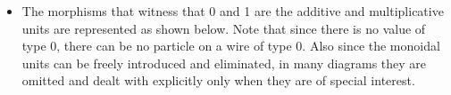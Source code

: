 \documentclass[preprint]{sigplanconf}
\begin{document}
\begin{itemize}
\item The morphisms that witness that {{0}} and {{1}} are the additive and
  multiplicative units are represented as shown below. Note that since there
  is no value of type 0, there can be no particle on a wire of type {{0}}.
  Also since the monoidal units can be freely introduced and eliminated, in
  many diagrams they are omitted and dealt with explicitly only when they are
  of special interest.
\begin{multicols}{2}
\begin{center}
\end{center}
\begin{center}
\end{center}  
\end{multicols}
\begin{multicols}{2}
\begin{center}
\end{center}
\columnbreak
\begin{center}
\end{center}
\end{multicols}


\end{itemize}
\end{document}
